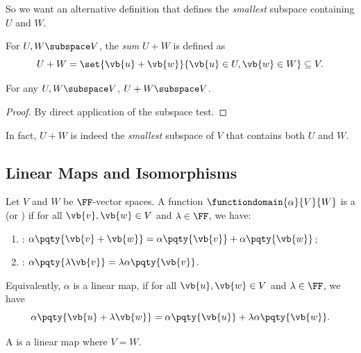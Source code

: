 So we want an alternative definition that defines the \emph{smallest} subspace containing \(U\) and \(W\).

\begin{definition}
    For \(U, W \subspace V\), the \emph{sum} \(U + W\) is defined as
    \[
        U + W = \set{\vb{u} + \vb{w}}{\vb{u} \in U, \vb{w} \in W} \subseteq V.
    \]
\end{definition}

\begin{proposition}
    For any \(U, W \subspace V\), \(U + W \subspace V\).
\end{proposition}

\begin{proof}
    By direct application of the subspace test.
\end{proof}

\begin{remark}
    In fact, \(U + W\) is indeed the \emph{smallest} subspace of \(V\) that contains both \(U\) and \(W\).
\end{remark}

\subsection{Linear Maps and Isomorphisms}

\begin{definition}
    Let \(V\) and \(W\) be \(\FF\)-vector spaces. A function \(\functiondomain{\alpha}{V}{W}\) is a  (or ) if for all \(\vb{v}, \vb{w} \in V\) and \(\lambda \in \FF\), we have:
    \begin{enumerate}
        \item {}: \(\alpha \pqty{\vb{v} + \vb{w}} = \alpha \pqty{\vb{v}} + \alpha \pqty{\vb{w}}\);
        \item {}: \(\alpha \pqty{\lambda \vb{v}} = \lambda \alpha \pqty{\vb{v}}\).
    \end{enumerate}

    Equivalently, \(\alpha\) is a linear map, if for all \(\vb{u}, \vb{w} \in V\) and \(\lambda \in \FF\), we have
    \[
        \alpha \pqty{\vb{u} + \lambda \vb{w}} = \alpha \pqty{\vb{u}} + \lambda \alpha \pqty{\vb{w}}.
    \]
\end{definition}

\begin{definition}[Endomorphism]
    A  is a linear map where \(V = W\).
\end{definition}

